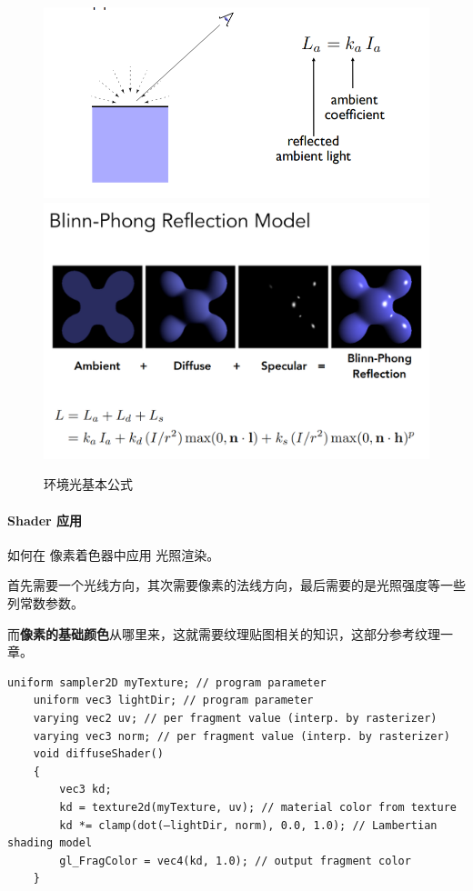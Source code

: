 \documentclass[UTF8,a4paper,12pt]{ctexbook}
\begin{document}
				\begin{figure}[H]
					\includegraphics[width=\linewidth]{LightBasic-04}
					\includegraphics[width=\linewidth]{LightBasic-05}
					\caption{环境光基本公式}
				\end{figure}			
			
			
			\paragraph{Shader 应用}
				如何在 像素着色器中应用 光照渲染。
				
				首先需要一个光线方向，其次需要像素的法线方向，最后需要的是光照强度等一些列常数参数。
				
			
				而\textbf{像素的基础颜色}从哪里来，这就需要纹理贴图相关的知识，这部分参考纹理一章。
				
				\begin{lstlisting}[frame=L]
	uniform sampler2D myTexture; // program parameter
	uniform vec3 lightDir; // program parameter 
	varying vec2 uv; // per fragment value (interp. by rasterizer) 
	varying vec3 norm; // per fragment value (interp. by rasterizer)
	void diffuseShader() 
	{ 
		vec3 kd; 
		kd = texture2d(myTexture, uv); // material color from texture
		kd *= clamp(dot(–lightDir, norm), 0.0, 1.0); // Lambertian shading model
		gl_FragColor = vec4(kd, 1.0); // output fragment color
	}								
				\end{lstlisting}
				
\end{document}
